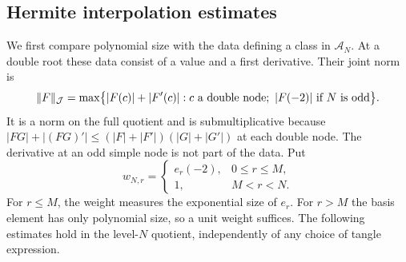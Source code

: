 \subsection{Hermite interpolation estimates}\label{cs:conditioning}

We first compare polynomial size with the data defining a class in
$\mathscr A_N$. At a double root these data consist of a value and a
first derivative. Their joint norm is
\[
 \lVert F\rVert_{\mathcal J}=\max\bigl\{|F(c)|+|F'(c)|:c\text{ a double node};
                     \ |F(-2)|\text{ if }N\text{ is odd}\bigr\}.
\]
It is a norm on the full quotient and is submultiplicative because
\(|FG|+|(FG)'|\le(|F|+|F'|)(|G|+|G'|)\) at each double node.
The derivative at an odd simple node is not part of the data.
Put
\begin{equation}\label{cs:weights}
 w_{N,r}=\begin{cases}e_r(-2),&0\le r\le M,\\1,&M<r<N.\end{cases}
\end{equation}
For $r\le M$, the weight measures the exponential size of $e_r$.
For $r>M$ the basis element has only polynomial size, so a unit weight
suffices. The following estimates hold in the level-$N$ quotient,
independently of any choice of tangle expression.

